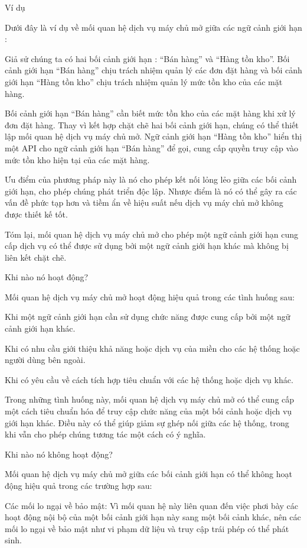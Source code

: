 Ví dụ

Dưới đây là ví dụ về mối quan hệ dịch vụ máy chủ mở giữa các ngữ cảnh giới hạn :

Giả sử chúng ta có hai bối cảnh giới hạn : “Bán hàng” và “Hàng tồn kho”. Bối cảnh giới hạn “Bán hàng” chịu trách nhiệm quản lý các đơn đặt hàng và bối cảnh giới hạn “Hàng tồn kho” chịu trách nhiệm quản lý mức tồn kho của các mặt hàng.

Bối cảnh giới hạn “Bán hàng” cần biết mức tồn kho của các mặt hàng khi xử lý đơn đặt hàng. Thay vì kết hợp chặt chẽ hai bối cảnh giới hạn, chúng có thể thiết lập mối quan hệ dịch vụ máy chủ mở. Ngữ cảnh giới hạn “Hàng tồn kho” hiển thị một API cho ngữ cảnh giới hạn “Bán hàng” để gọi, cung cấp quyền truy cập vào mức tồn kho hiện tại của các mặt hàng.

Ưu điểm của phương pháp này là nó cho phép kết nối lỏng lẻo giữa các bối cảnh giới hạn, cho phép chúng phát triển độc lập. Nhược điểm là nó có thể gây ra các vấn đề phức tạp hơn và tiềm ẩn về hiệu suất nếu dịch vụ máy chủ mở không được thiết kế tốt.

Tóm lại, mối quan hệ dịch vụ máy chủ mở cho phép một ngữ cảnh giới hạn cung cấp dịch vụ có thể được sử dụng bởi một ngữ cảnh giới hạn khác mà không bị liên kết chặt chẽ.

Khi nào nó hoạt động?

Mối quan hệ dịch vụ máy chủ mở hoạt động hiệu quả trong các tình huống sau:

Khi một ngữ cảnh giới hạn cần sử dụng chức năng được cung cấp bởi một ngữ cảnh giới hạn khác.

Khi có nhu cầu giới thiệu khả năng hoặc dịch vụ của miền cho các hệ thống hoặc người dùng bên ngoài.

Khi có yêu cầu về cách tích hợp tiêu chuẩn với các hệ thống hoặc dịch vụ khác.

Trong những tình huống này, mối quan hệ dịch vụ máy chủ mở có thể cung cấp một cách tiêu chuẩn hóa để truy cập chức năng của một bối cảnh hoặc dịch vụ giới hạn khác. Điều này có thể giúp giảm sự ghép nối giữa các hệ thống, trong khi vẫn cho phép chúng tương tác một cách có ý nghĩa.

Khi nào nó không hoạt động?

Mối quan hệ dịch vụ máy chủ mở giữa các bối cảnh giới hạn có thể không hoạt động hiệu quả trong các trường hợp sau:

Các mối lo ngại về bảo mật: Vì mối quan hệ này liên quan đến việc phơi bày các hoạt động nội bộ của một bối cảnh giới hạn này sang một bối cảnh khác, nên các mối lo ngại về bảo mật như vi phạm dữ liệu và truy cập trái phép có thể phát sinh.

